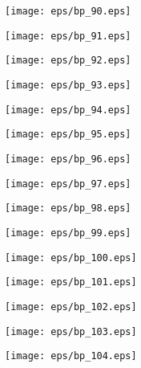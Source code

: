 \documentclass{book}
\begin{document}
	\clearpage\begin{figure}[p]
    \centering
	\texttt{[image: eps/bp\_90.eps]}
	\end{figure}
	\clearpage\begin{figure}[p]
    \centering
	\texttt{[image: eps/bp\_91.eps]}
	\end{figure}
	\clearpage\begin{figure}[p]
    \centering
	\texttt{[image: eps/bp\_92.eps]}
	\end{figure}
	\clearpage\begin{figure}[p]
    \centering
	\texttt{[image: eps/bp\_93.eps]}
	\end{figure}
	\clearpage\begin{figure}[p]
    \centering
	\texttt{[image: eps/bp\_94.eps]}
	\end{figure}
	\clearpage\begin{figure}[p]
    \centering
	\texttt{[image: eps/bp\_95.eps]}
	\end{figure}
	\clearpage\begin{figure}[p]
    \centering
	\texttt{[image: eps/bp\_96.eps]}
	\end{figure}
	\clearpage\begin{figure}[p]
    \centering
	\texttt{[image: eps/bp\_97.eps]}
	\end{figure}
	\clearpage\begin{figure}[p]
    \centering
	\texttt{[image: eps/bp\_98.eps]}
	\end{figure}
	\clearpage\begin{figure}[p]
    \centering
	\texttt{[image: eps/bp\_99.eps]}
	\end{figure}
	\clearpage\begin{figure}[p]
    \centering
	\texttt{[image: eps/bp\_100.eps]}
	\end{figure}
	\clearpage\begin{figure}[p]
    \centering
	\texttt{[image: eps/bp\_101.eps]}
	\end{figure}
	\clearpage\begin{figure}[p]
    \centering
	\texttt{[image: eps/bp\_102.eps]}
	\end{figure}
	\clearpage\begin{figure}[p]
    \centering
	\texttt{[image: eps/bp\_103.eps]}
	\end{figure}
	\clearpage\begin{figure}[p]
    \centering
	\texttt{[image: eps/bp\_104.eps]}
	\end{figure}
\end{document}
